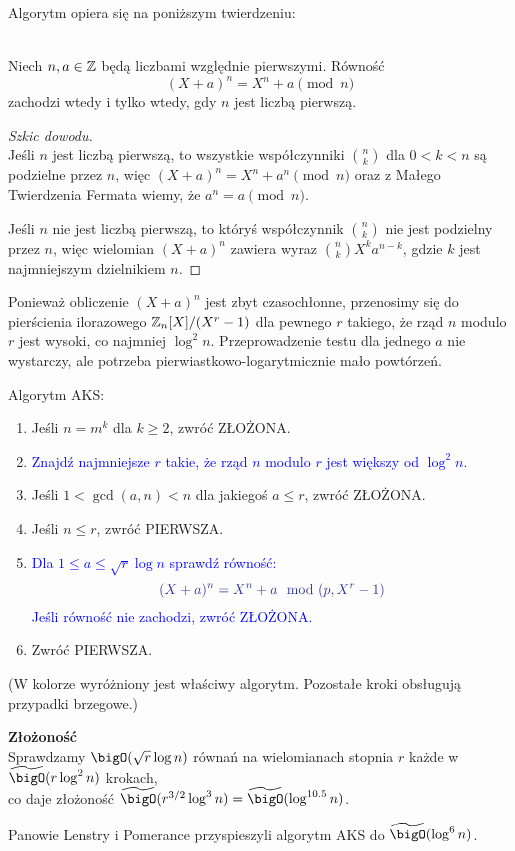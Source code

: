 Algorytm opiera się na poniższym twierdzeniu:

\begin{theorem} \\
Niech \( n, a \in \mathbb{Z} \) będą liczbami względnie pierwszymi. Równość
\[
    (X + a)^n = X^n + a \pmod{n}
\]
zachodzi wtedy i tylko wtedy, gdy \( n \) jest liczbą pierwszą.
\end{theorem}
\begin{proof}[Szkic dowodu]\\
Jeśli \( n \) jest liczbą pierwszą, to wszystkie współczynniki \( n \choose k \) dla \( 0 < k < n \) są podzielne przez \( n \), więc \( (X + a)^n = X^n + a^n \pmod{n} \) oraz z Małego Twierdzenia Fermata wiemy, że \( a^n = a \pmod{n} \).

Jeśli \( n \) nie jest liczbą pierwszą, to któryś współczynnik \( n \choose k \) nie jest podzielny przez \( n \), więc wielomian \( (X + a)^n \) zawiera wyraz \( {n \choose k} X^ka^{n-k} \), gdzie \( k \) jest najmniejszym dzielnikiem \( n \).
\end{proof}

Ponieważ obliczenie \( (X + a)^n \) jest zbyt czasochłonne, przenosimy się do pierścienia ilorazowego \( \mathbb{Z}_n[X]/(X^r - 1) \) dla pewnego \( r \) takiego, że rząd \( n \)
modulo \( r \) jest wysoki, co najmniej \( \log^2n \). Przeprowadzenie testu dla jednego \( a \) nie wystarczy, ale potrzeba pierwiastkowo-logarytmicznie mało powtórzeń.

\newpage
\begin{greyframe}
    Algorytm AKS:
    \begin{enumerate}
        \item Jeśli \( n = m^k \) dla \( k \geq 2 \), zwróć ZŁOŻONA.
        \item \textcolor{Blue}{Znajdź najmniejsze \( r \) takie, że rząd \( n \) modulo \( r \) jest większy od \( \log^2n \).}
        \item Jeśli \( 1 < \gcd(a, n) < n \) dla jakiegoś \( a \leq r \), zwróć ZŁOŻONA.
        \item Jeśli \( n \leq r \), zwróć PIERWSZA.
        \item \textcolor{Blue}{Dla \( 1 \leq a \leq \sqrt{r}\log n \) sprawdź równość:}
        \[
            \textcolor{Blue}{(X + a)^n = X^n + a \mod (p, X^r-1)}
        \]
        \textcolor{Blue}{Jeśli równość nie zachodzi, zwróć ZŁOŻONA.}
        \item Zwróć PIERWSZA.
    \end{enumerate}
\end{greyframe}
{\small (W kolorze wyróżniony jest właściwy algorytm. Pozostałe kroki obsługują przypadki brzegowe.)}

\textbf{Złożoność} \\
Sprawdzamy \( \bigO(\sqrt{r} \log n) \) równań na wielomianach stopnia \( r \) każde w \( \widetilde{\bigO}(r \log^2n) \) krokach, \\ co daje złożoność \( \widetilde{\bigO}(r^{3/2} \log^3n) = \widetilde{\bigO}(\log^{10.5}n)\).

Panowie Lenstry i Pomerance przyspieszyli algorytm AKS do \( \widetilde{\bigO}(\log^6n) \).

